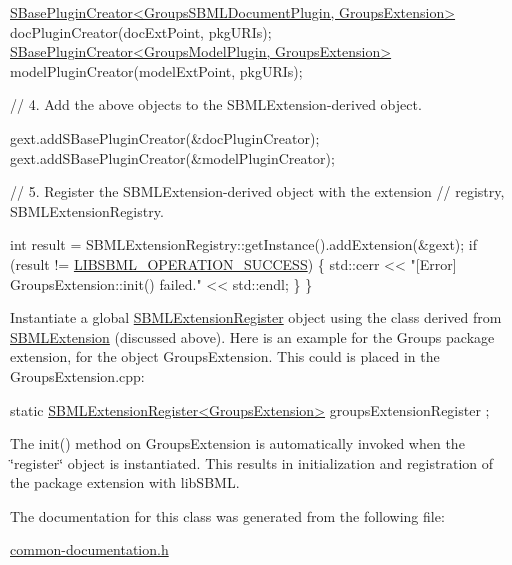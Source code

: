 \begin{DoxyCode}
  \hyperlink{class_s_base_plugin_creator}{SBasePluginCreator<GroupsSBMLDocumentPlugin, GroupsExtension>}
       docPluginCreator(docExtPoint, pkgURIs);
  \hyperlink{class_s_base_plugin_creator}{SBasePluginCreator<GroupsModelPlugin, GroupsExtension>}
       modelPluginCreator(modelExtPoint, pkgURIs);

  \textcolor{comment}{// 4. Add the above objects to the SBMLExtension-derived object.}

  gext.addSBasePluginCreator(&docPluginCreator);
  gext.addSBasePluginCreator(&modelPluginCreator);

  \textcolor{comment}{// 5. Register the SBMLExtension-derived object with the extension}
  \textcolor{comment}{// registry, SBMLExtensionRegistry.}

  \textcolor{keywordtype}{int} result = SBMLExtensionRegistry::getInstance().addExtension(&gext);
  \textcolor{keywordflow}{if} (result != \hyperlink{operation_return_values_8h_a87d90022619ee855654b2b8f4997886daf67ea900ebcd56036019237463be26b3}{LIBSBML\_OPERATION\_SUCCESS})
  \{
    std::cerr << \textcolor{stringliteral}{"[Error] GroupsExtension::init() failed."} << std::endl;
  \}
\}
\end{DoxyCode}


Instantiate a global \hyperlink{class_s_b_m_l_extension_register}{S\+B\+M\+L\+Extension\+Register} object using the class derived from \hyperlink{class_s_b_m_l_extension}{S\+B\+M\+L\+Extension} (discussed above). Here is an example for the Groups package extension, for the object {\ttfamily Groups\+Extension}. This could is placed in the {\ttfamily Groups\+Extension.\+cpp}\+: 
\begin{DoxyCode}
\textcolor{keyword}{static} \hyperlink{class_s_b_m_l_extension_register}{SBMLExtensionRegister<GroupsExtension>} groupsExtensionRegister
      ;
\end{DoxyCode}


The {\ttfamily init()} method on {\ttfamily Groups\+Extension} is automatically invoked when the \char`\"{}register\char`\"{} object is instantiated. This results in initialization and registration of the package extension with lib\+S\+B\+ML. 

The documentation for this class was generated from the following file\+:\begin{DoxyCompactItemize}
\item 
\hyperlink{common-documentation_8h}{common-\/documentation.\+h}\end{DoxyCompactItemize}
